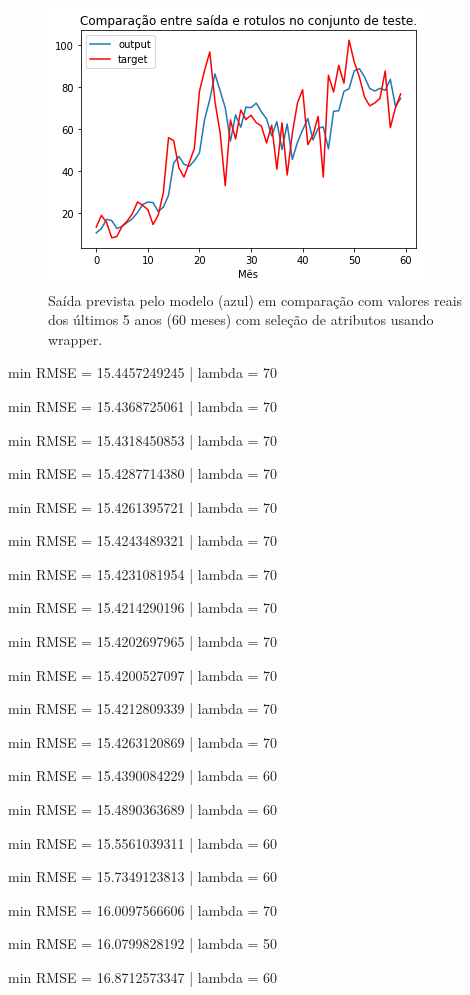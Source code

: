 \documentclass[a4paper, 12pt]{article}
\begin{document}
\begin{figure}[h!]
    \centering
    \includegraphics[width=10cm]{images/wrapper.png}
    \caption{Saída prevista pelo modelo (azul) em comparação com valores reais dos últimos 5 anos (60 meses) com seleção de atributos usando wrapper.}
\end{figure}


min RMSE = 15.4457249245 | lambda = 70

min RMSE = 15.4368725061 | lambda = 70

min RMSE = 15.4318450853 | lambda = 70

min RMSE = 15.4287714380 | lambda = 70

min RMSE = 15.4261395721 | lambda = 70

min RMSE = 15.4243489321 | lambda = 70

min RMSE = 15.4231081954 | lambda = 70

min RMSE = 15.4214290196 | lambda = 70

min RMSE = 15.4202697965 | lambda = 70

min RMSE = 15.4200527097 | lambda = 70

min RMSE = 15.4212809339 | lambda = 70

min RMSE = 15.4263120869 | lambda = 70

min RMSE = 15.4390084229 | lambda = 60

min RMSE = 15.4890363689 | lambda = 60

min RMSE = 15.5561039311 | lambda = 60

min RMSE = 15.7349123813 | lambda = 60

min RMSE = 16.0097566606 | lambda = 70

min RMSE = 16.0799828192 | lambda = 50

min RMSE = 16.8712573347 | lambda = 60
\end{document}
